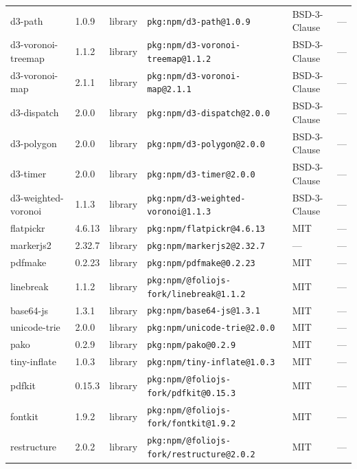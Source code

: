 \documentclass[11pt,a4paper]{article}
\begin{document}
\begin{longtable}{|p{4cm}|p{2cm}|p{1.6cm}|p{5cm}|p{1.5cm}|p{3.5cm}|}
\raggedright d3-path & 1.0.9 & library & \small\texttt{pkg:npm/d3-path@1.0.9} & BSD-3-Clause & \small — \\
\raggedright d3-voronoi-treemap & 1.1.2 & library & \small\texttt{pkg:npm/d3-voronoi-treemap@1.1.2} & BSD-3-Clause & \small — \\
\raggedright d3-voronoi-map & 2.1.1 & library & \small\texttt{pkg:npm/d3-voronoi-map@2.1.1} & BSD-3-Clause & \small — \\
\raggedright d3-dispatch & 2.0.0 & library & \small\texttt{pkg:npm/d3-dispatch@2.0.0} & BSD-3-Clause & \small — \\
\raggedright d3-polygon & 2.0.0 & library & \small\texttt{pkg:npm/d3-polygon@2.0.0} & BSD-3-Clause & \small — \\
\raggedright d3-timer & 2.0.0 & library & \small\texttt{pkg:npm/d3-timer@2.0.0} & BSD-3-Clause & \small — \\
\raggedright d3-weighted-voronoi & 1.1.3 & library & \small\texttt{pkg:npm/d3-weighted-voronoi@1.1.3} & BSD-3-Clause & \small — \\
\raggedright flatpickr & 4.6.13 & library & \small\texttt{pkg:npm/flatpickr@4.6.13} & MIT & \small — \\
\raggedright markerjs2 & 2.32.7 & library & \small\texttt{pkg:npm/markerjs2@2.32.7} & — & \small — \\
\raggedright pdfmake & 0.2.23 & library & \small\texttt{pkg:npm/pdfmake@0.2.23} & MIT & \small — \\
\raggedright linebreak & 1.1.2 & library & \small\texttt{pkg:npm/@foliojs-fork/linebreak@1.1.2} & MIT & \small — \\
\raggedright base64-js & 1.3.1 & library & \small\texttt{pkg:npm/base64-js@1.3.1} & MIT & \small — \\
\raggedright unicode-trie & 2.0.0 & library & \small\texttt{pkg:npm/unicode-trie@2.0.0} & MIT & \small — \\
\raggedright pako & 0.2.9 & library & \small\texttt{pkg:npm/pako@0.2.9} & MIT & \small — \\
\raggedright tiny-inflate & 1.0.3 & library & \small\texttt{pkg:npm/tiny-inflate@1.0.3} & MIT & \small — \\
\raggedright pdfkit & 0.15.3 & library & \small\texttt{pkg:npm/@foliojs-fork/pdfkit@0.15.3} & MIT & \small — \\
\raggedright fontkit & 1.9.2 & library & \small\texttt{pkg:npm/@foliojs-fork/fontkit@1.9.2} & MIT & \small — \\
\raggedright restructure & 2.0.2 & library & \small\texttt{pkg:npm/@foliojs-fork/restructure@2.0.2} & MIT & \small — \\

\end{longtable}
\end{document}
